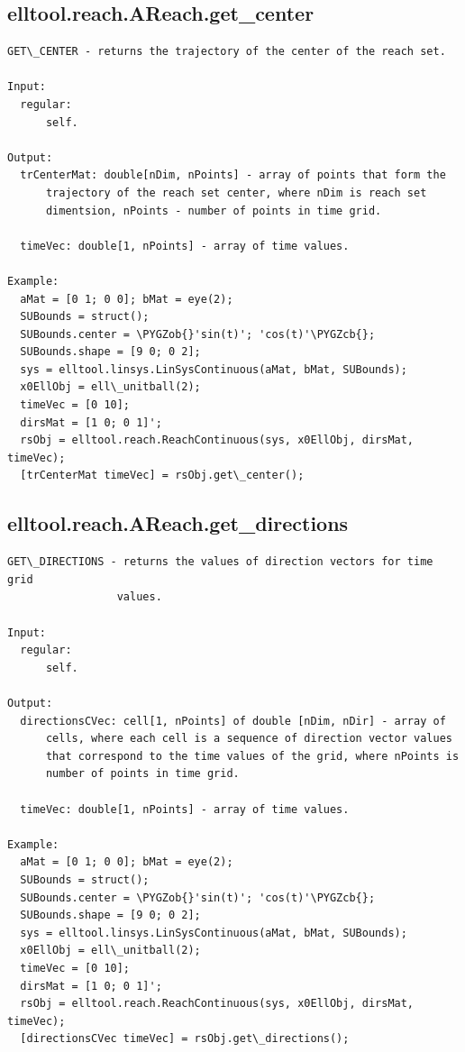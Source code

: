\documentclass[letterpaper,10pt,english]{sphinxmanual}
\def\PYGZob{\char`\{}
\def\PYGZcb{\char`\}}
\begin{document}
\subsection{elltool.reach.AReach.get\_center}
\label{chap_functions:elltool-reach-areach-get-center}
\begin{Verbatim}[commandchars=\\\{\}]
GET\_CENTER - returns the trajectory of the center of the reach set.

Input:
  regular:
      self.

Output:
  trCenterMat: double[nDim, nPoints] - array of points that form the
      trajectory of the reach set center, where nDim is reach set
      dimentsion, nPoints - number of points in time grid.

  timeVec: double[1, nPoints] - array of time values.

Example:
  aMat = [0 1; 0 0]; bMat = eye(2);
  SUBounds = struct();
  SUBounds.center = \PYGZob{}'sin(t)'; 'cos(t)'\PYGZcb{};
  SUBounds.shape = [9 0; 0 2];
  sys = elltool.linsys.LinSysContinuous(aMat, bMat, SUBounds);
  x0EllObj = ell\_unitball(2);
  timeVec = [0 10];
  dirsMat = [1 0; 0 1]';
  rsObj = elltool.reach.ReachContinuous(sys, x0EllObj, dirsMat, timeVec);
  [trCenterMat timeVec] = rsObj.get\_center();
\end{Verbatim}


\subsection{elltool.reach.AReach.get\_directions}
\label{chap_functions:elltool-reach-areach-get-directions}
\begin{Verbatim}[commandchars=\\\{\}]
GET\_DIRECTIONS - returns the values of direction vectors for time grid
                 values.

Input:
  regular:
      self.

Output:
  directionsCVec: cell[1, nPoints] of double [nDim, nDir] - array of
      cells, where each cell is a sequence of direction vector values
      that correspond to the time values of the grid, where nPoints is
      number of points in time grid.

  timeVec: double[1, nPoints] - array of time values.

Example:
  aMat = [0 1; 0 0]; bMat = eye(2);
  SUBounds = struct();
  SUBounds.center = \PYGZob{}'sin(t)'; 'cos(t)'\PYGZcb{};
  SUBounds.shape = [9 0; 0 2];
  sys = elltool.linsys.LinSysContinuous(aMat, bMat, SUBounds);
  x0EllObj = ell\_unitball(2);
  timeVec = [0 10];
  dirsMat = [1 0; 0 1]';
  rsObj = elltool.reach.ReachContinuous(sys, x0EllObj, dirsMat, timeVec);
  [directionsCVec timeVec] = rsObj.get\_directions();
\end{Verbatim}
\end{document}
